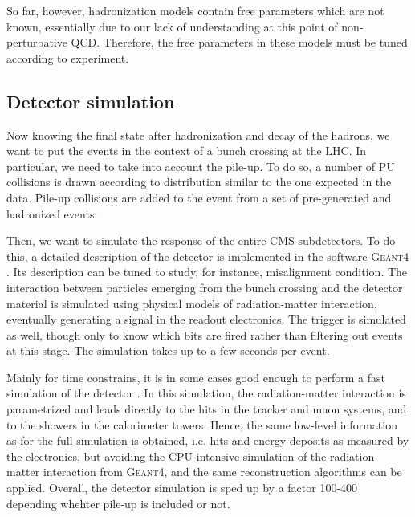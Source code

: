             So far, however, hadronization models contain free parameters which are not known,
            essentially due to our lack of understanding at this point of non-perturbative
            QCD. Therefore, the free parameters in these models must be tuned according to
            experiment.

            \subsection{Detector simulation}

            Now knowing the final state after hadronization and decay of the hadrons, we
            want to put the events in the context of a bunch crossing at the LHC. In
            particular, we need to take into account the pile-up. To do so, a number of
            PU collisions is drawn according to distribution similar to the
            one expected in the data. Pile-up collisions are added to the event from a
            set of pre-generated and hadronized events.

            Then, we want to simulate the response of the entire CMS subdetectors. To do
            this, a detailed description of the detector is implemented in the software
            \textsc{Geant4} . Its description can be tuned to study, for instance,
            misalignment condition. The interaction between particles emerging from
            the bunch crossing and the detector material is simulated using physical
            models of radiation-matter interaction, eventually generating a signal in
            the readout electronics. The trigger is simulated as well, though only to know
            which bits are fired rather than filtering out events at this stage. The
            simulation takes up to a few seconds per event.

            Mainly for time constrains, it is in some cases good enough to perform a
            fast simulation of the detector \cite{Fastsim}. In this simulation, the radiation-matter
            interaction is parametrized and leads
            directly to the hits in the tracker and muon systems, and to the showers
            in the calorimeter towers. Hence, the same low-level information as for the
            full simulation is obtained, i.e. hits and energy deposits as measured by
            the electronics, but avoiding the CPU-intensive simulation of the radiation-matter interaction
            from \textsc{Geant4}, and the same reconstruction algorithms can be applied.
            Overall, the detector simulation is sped up by a factor 100-400 depending whehter
            pile-up is included or not.

